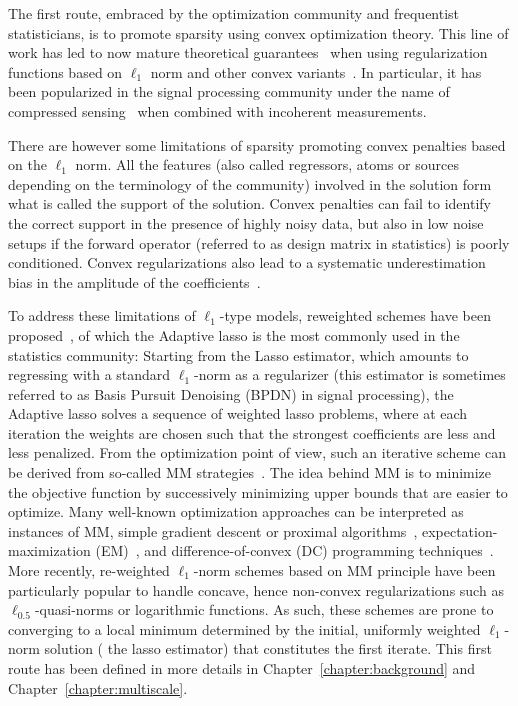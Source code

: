 The first route, embraced by the optimization community and frequentist
statisticians, is to promote sparsity using convex optimization theory.
This line of work has led to now mature theoretical guarantees~\cite{FoRa13} when using regularization functions based on $\ell_1$ norm and other convex variants~\cite{Tibshirani96}. In particular, it has been popularized in the signal processing community under the name of compressed sensing~\cite{candes2008introduction} when combined with incoherent measurements.

There are however some limitations of sparsity promoting convex penalties based on the $\ell_1$ norm.
All the features (also called regressors, atoms or sources depending on the terminology of the community) involved in the solution form what is called the support of the solution.
Convex penalties can fail to identify the correct support in the presence of highly noisy data, but also in low noise setups if the forward operator (referred to as design matrix in statistics) is poorly conditioned. Convex regularizations also lead to a systematic underestimation bias in the amplitude of the coefficients~\cite{OsBuGoXuYi06,candes2008enhancing,chartrand2007exact,saab2008stable,ChHeSa17}.

To address these limitations of $\ell_1$-type models, reweighted schemes have been proposed~\cite{candes2008enhancing,Gasso,Rakotomamonjy,zhang2011sparse,strohmeier-etal:16}, of which the Adaptive \ac{lasso} \cite{Zou06} is the most commonly used in the statistics community: Starting from the Lasso estimator, which amounts to regressing with a standard $\ell_1$-norm as a regularizer (this estimator is sometimes referred to as Basis Pursuit Denoising (BPDN) \cite{Chen_Donoho_Saunders98} in signal processing), the Adaptive \ac{lasso} solves a sequence of weighted \ac{lasso} problems, where at each iteration the weights are chosen such that the strongest coefficients are less and less penalized.
From the optimization point of view, such an iterative scheme can be derived from so-called \ac{MM} strategies~\cite{lange2000optimization,schifano2010majorization}.
The idea behind MM is to minimize the objective function by successively minimizing upper bounds that are easier to optimize. Many well-known optimization approaches can be interpreted as instances of MM, \textit{\eg} simple gradient descent or proximal algorithms~\cite{Combettes2011}, expectation-maximization (EM)~\cite{Dempster77maximumlikelihood}, and difference-of-convex (DC) programming techniques~\cite{Horst:1999}.
%
More recently, re-weighted $\ell_1$-norm schemes based on \ac{MM} principle have been particularly popular to handle concave, hence non-convex regularizations such as $\ell_{0.5}$-quasi-norms or logarithmic functions. As such, these schemes are prone to converging to a local minimum determined by the initial, uniformly weighted $\ell_1$-norm solution (\textit{\ie} the \ac{lasso} estimator) that constitutes the first iterate. This first route has been defined in more details in Chapter~\ref{chapter:background} and Chapter~\ref{chapter:multiscale}.

